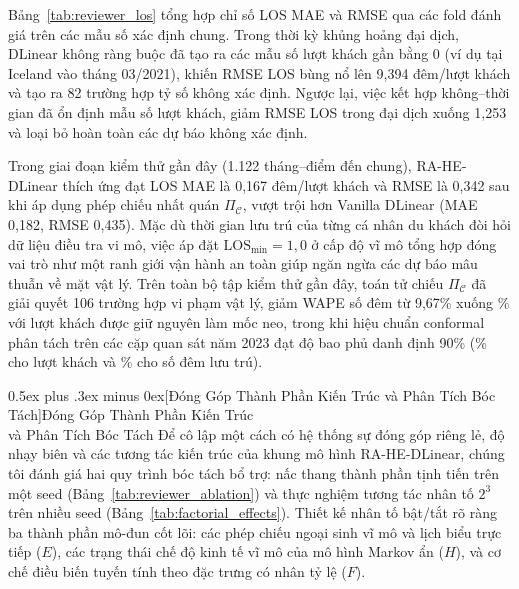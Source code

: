 \documentclass[10pt,journal,compsoc]{IEEEtran}
\makeatletter
\def\subsection{\@startsection{subsection}{2}{\z@}{-1.8ex plus -0.6ex minus -0.3ex}%
{0.5ex plus .3ex minus 0ex}{\normalfont\normalsize\rmfamily\bfseries}}
\makeatother
\begin{document}


Bảng~\ref{tab:reviewer_los} tổng hợp chỉ số LOS MAE và RMSE qua các fold đánh giá trên các mẫu số xác định chung. Trong thời kỳ khủng hoảng đại dịch, DLinear không ràng buộc đã tạo ra các mẫu số lượt khách gần bằng 0 (ví dụ tại Iceland vào tháng 03/2021), khiến RMSE LOS bùng nổ lên 9,394 đêm/lượt khách và tạo ra 82 trường hợp tỷ số không xác định. Ngược lại, việc kết hợp không--thời gian đã ổn định mẫu số lượt khách, giảm RMSE LOS trong đại dịch xuống 1,253 và loại bỏ hoàn toàn các dự báo không xác định.

Trong giai đoạn kiểm thử gần đây (1.122 tháng--điểm đến chung), RA-HE-DLinear thích ứng đạt LOS MAE là 0,167 đêm/lượt khách và RMSE là 0,342 sau khi áp dụng phép chiếu nhất quán $\Pi_{\mathcal{C}}$, vượt trội hơn Vanilla DLinear (MAE 0,182, RMSE 0,435). Mặc dù thời gian lưu trú của từng cá nhân du khách đòi hỏi dữ liệu điều tra vi mô, việc áp đặt $\text{LOS}_{\min} = 1{,}0$ ở cấp độ vĩ mô tổng hợp đóng vai trò như một ranh giới vận hành an toàn giúp ngăn ngừa các dự báo mâu thuẫn về mặt vật lý. Trên toàn bộ tập kiểm thử gần đây, toán tử chiếu $\Pi_{\mathcal{C}}$ đã giải quyết 106 trường hợp vi phạm vật lý, giảm WAPE số đêm từ 9,67\% xuống \ReviewerNightsWAPE{}\% với lượt khách được giữ nguyên làm mốc neo, trong khi hiệu chuẩn conformal phân tách trên các cặp quan sát năm 2023 đạt độ bao phủ danh định 90\% (\ReviewerArrivalCoverage{}\% cho lượt khách và \ReviewerNightsCoverage{}\% cho số đêm lưu trú).

\subsection[Đóng Góp Thành Phần Kiến Trúc và Phân Tích Bóc Tách]{Đóng Góp Thành Phần Kiến Trúc\\và Phân Tích Bóc Tách}
\label{sec:component_contributions}
Để cô lập một cách có hệ thống sự đóng góp riêng lẻ, độ nhạy biên và các tương tác kiến trúc của khung mô hình RA-HE-DLinear, chúng tôi đánh giá hai quy trình bóc tách bổ trợ: nấc thang thành phần tịnh tiến trên một seed (Bảng~\ref{tab:reviewer_ablation}) và thực nghiệm tương tác nhân tố $2^3$ trên nhiều seed (Bảng~\ref{tab:factorial_effects}). Thiết kế nhân tố bật/tắt rõ ràng ba thành phần mô-đun cốt lõi: các phép chiếu ngoại sinh vĩ mô và lịch biểu trực tiếp ($E$), các trạng thái chế độ kinh tế vĩ mô của mô hình Markov ẩn ($H$), và cơ chế điều biến tuyến tính theo đặc trưng có nhân tỷ lệ ($F$).
\end{document}
